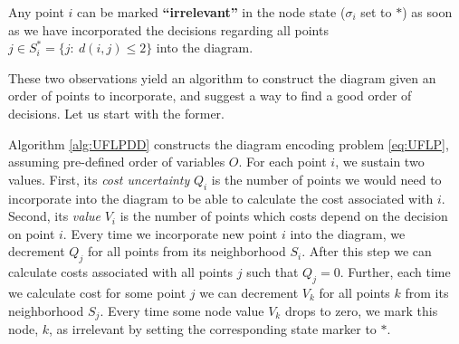 \documentclass[11pt]{article}
\begin{document}
Any point \textcircled{$i$} can be marked \textbf{``irrelevant''} in the node state
(\(\sigma_i\) set to \(*\)) as soon as we have incorporated the decisions regarding all
points \(j\in S^*_i = \{j:~d(i,j)\leq 2\}\) into the diagram.

These two observations yield an algorithm to construct the diagram given an
order of points to incorporate, and suggest a way to find a good order of
decisions. Let us start with the former.

Algorithm \ref{alg:UFLPDD} constructs the diagram encoding problem \eqref{eq:UFLP},
assuming pre-defined order of variables \(O\). For each point \textcircled{$i$},
we sustain two values. First, its \emph{cost uncertainty} \(Q_i\) is the number of
points we would need to incorporate into the diagram to be able to calculate the
cost associated with \textcircled{$i$}. Second, its \emph{value} \(V_i\) is the number
of points which costs depend on the decision on point \textcircled{$i$}. Every
time we incorporate new point \textcircled{$i$} into the diagram, we decrement
\(Q_j\) for all points from its neighborhood \(S_i\). After this step we can
calculate costs associated with all points \(j\) such that \(Q_j=0\). Further, each
time we calculate cost for some point \(j\) we can decrement \(V_k\) for all points
\(k\) from its neighborhood \(S_j\). Every time some node value \(V_k\) drops to zero,
we mark this node, \textcircled{$k$}, as irrelevant by setting the
corresponding state marker to \(*\).
\end{document}
